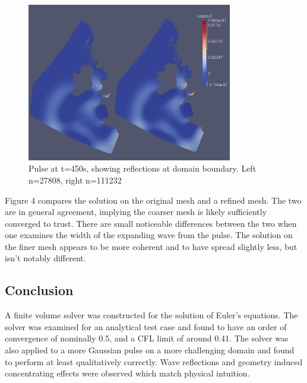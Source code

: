 \documentclass[letterpaper,10pt]{article}
\begin{document}
\begin{figure}[!htb]
\centering
\includegraphics[width=0.8\textwidth]{captureTAB.PNG}
\caption{\label{fig:unrolled}Pulse at t=450s, showing reflections at domain boundary. Left n=27808, right n=111232 }
\end{figure}
\newpage

Figure 4 compares the solution on the original mesh and a refined mesh. The two are in general agreement, implying the coarser mesh is likely sufficiently converged to trust. There are small noticeable differences between the two when one examines the width of the expanding wave from the pulse. The solution on the finer mesh appears to be more coherent and to have spread slightly less, but isn't notably different.

\subsection*{Conclusion}
A finite volume solver was constructed for the solution of Euler's equations. The solver was examined for an analytical test case and found to have an order of convergence of nominally 0.5, and a CFL limit of around 0.41. The solver was also applied to a more Gaussian pulse on a more challenging domain and found to perform at least qualitatively correctly. Wave reflections and geometry induced concentrating effects were observed which match physical intuition.
\end{document}
